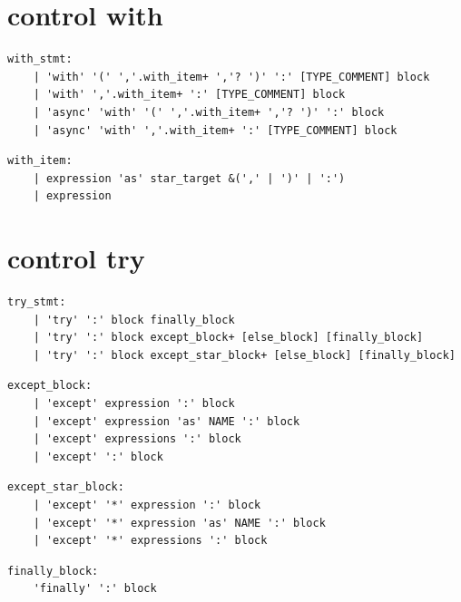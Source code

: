 \section{control with}

\noindent\textbf{\texttt{}}\par
\begin{lstlisting}
with_stmt:
    | 'with' '(' ','.with_item+ ','? ')' ':' [TYPE_COMMENT] block
    | 'with' ','.with_item+ ':' [TYPE_COMMENT] block
    | 'async' 'with' '(' ','.with_item+ ','? ')' ':' block
    | 'async' 'with' ','.with_item+ ':' [TYPE_COMMENT] block
\end{lstlisting}

\noindent\textbf{\texttt{}}\par
\begin{lstlisting}
with_item:
    | expression 'as' star_target &(',' | ')' | ':')
    | expression
\end{lstlisting}

\section{control try}

\noindent\textbf{\texttt{}}\par
\begin{lstlisting}
try_stmt:
    | 'try' ':' block finally_block
    | 'try' ':' block except_block+ [else_block] [finally_block]
    | 'try' ':' block except_star_block+ [else_block] [finally_block]
\end{lstlisting}

\noindent\textbf{\texttt{}}\par
\begin{lstlisting}
except_block:
    | 'except' expression ':' block
    | 'except' expression 'as' NAME ':' block
    | 'except' expressions ':' block
    | 'except' ':' block
\end{lstlisting}

\noindent\textbf{\texttt{}}\par
\begin{lstlisting}
except_star_block:
    | 'except' '*' expression ':' block
    | 'except' '*' expression 'as' NAME ':' block
    | 'except' '*' expressions ':' block
\end{lstlisting}

\noindent\textbf{\texttt{}}\par
\begin{lstlisting}
finally_block:
    'finally' ':' block
\end{lstlisting}

